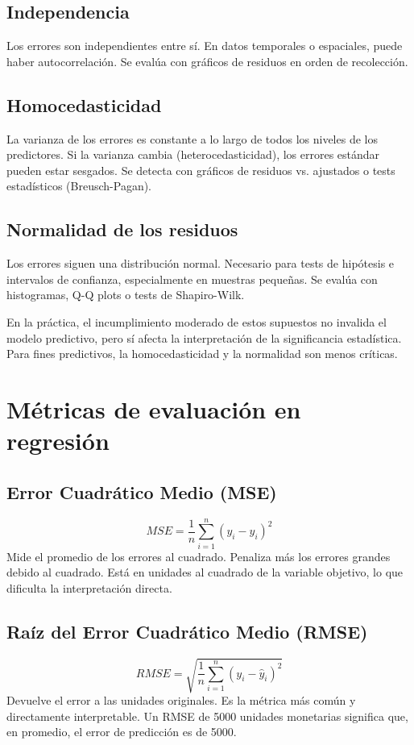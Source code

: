 \documentclass[12pt,a4paper,openany,oneside]{book}
\begin{document}
\subsection{Independencia}
Los errores son independientes entre sí. En datos temporales o espaciales, puede haber autocorrelación. Se evalúa con gráficos de residuos en orden de recolección.

\subsection{Homocedasticidad}
La varianza de los errores es constante a lo largo de todos los niveles de los predictores. Si la varianza cambia (heterocedasticidad), los errores estándar pueden estar sesgados. Se detecta con gráficos de residuos vs. ajustados o tests estadísticos (Breusch-Pagan).

\subsection{Normalidad de los residuos}
Los errores siguen una distribución normal. Necesario para tests de hipótesis e intervalos de confianza, especialmente en muestras pequeñas. Se evalúa con histogramas, Q-Q plots o tests de Shapiro-Wilk.

En la práctica, el incumplimiento moderado de estos supuestos no invalida el modelo predictivo, pero sí afecta la interpretación de la significancia estadística. Para fines predictivos, la homocedasticidad y la normalidad son menos críticas.

\section{Métricas de evaluación en regresión}

\subsection{Error Cuadrático Medio (MSE)}
\[
MSE = \frac{1}{n} \sum_{i=1}^n (y_i - \hat{y}_i)^2
\]
Mide el promedio de los errores al cuadrado. Penaliza más los errores grandes debido al cuadrado. Está en unidades al cuadrado de la variable objetivo, lo que dificulta la interpretación directa.

\subsection{Raíz del Error Cuadrático Medio (RMSE)}
\[
RMSE = \sqrt{\frac{1}{n} \sum_{i=1}^n (y_i - \hat{y}_i)^2}
\]
Devuelve el error a las unidades originales. Es la métrica más común y directamente interpretable. Un RMSE de 5000 unidades monetarias significa que, en promedio, el error de predicción es de 5000.
\end{document}
